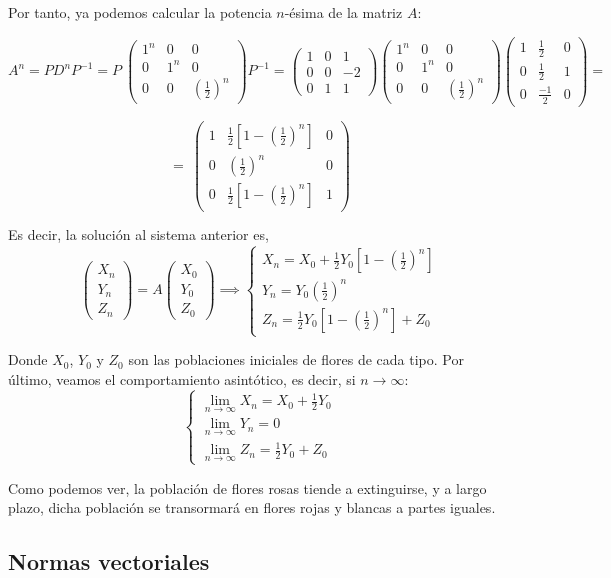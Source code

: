 \documentclass[11pt, a4paper]{article}
\newif\IfInSansMode
\numberwithin{equation}{section}
\theoremstyle{theorem-style}
\theoremstyle{definition-style}
\theoremstyle{remark-style}
\theoremstyle{example-style}
\begin{document}
Por tanto, ya podemos calcular la potencia $n$-ésima de la matriz $A$:

$$A^n = PD^nP^{-1} = P \
\begin{pmatrix}
  1^n & 0 & 0 \\
  0 & 1^n & 0 \\
  0 & 0 & \left(\frac{1}{2}\right)^n
\end{pmatrix} P^{-1} =
\begin{pmatrix}
  1 & 0 & 1 \\
  0 & 0 & -2 \\
  0 & 1 & 1
\end{pmatrix} \begin{pmatrix}
  1^n & 0 & 0 \\
  0 & 1^n & 0 \\
  0 & 0 & \left(\frac{1}{2}\right)^n
\end{pmatrix} \begin{pmatrix}
  1 & \frac{1}{2} & 0 \\
  0 & \frac{1}{2} & 1 \\
  0 & \frac{-1}{2} & 0
\end{pmatrix} = $$

$$= \
\begin{pmatrix}
  1 & \frac{1}{2} \left[1 -\left(\frac{1}{2}\right)^n \right] & 0 \\
  0 & \left( \frac{1}{2} \right)^n & 0 \\
  0 & \frac{1}{2} \left[1 -\left(\frac{1}{2}\right)^n \right] & 1
\end{pmatrix}$$


Es decir, la solución al sistema anterior es,
$$ \begin{pmatrix}
	X_n\\
	Y_n\\
	Z_n
\end{pmatrix} = A 
\begin{pmatrix}
	X_0\\
	Y_0\\
	Z_0
\end{pmatrix} \implies
\begin{cases}
  X_n = X_0 + \frac{1}{2} Y_0 \left[ 1 - \left( \frac{1}{2} \right)^n
  \right]\\
  Y_n = Y_0 \left( \frac{1}{2} \right)^n \\
  Z_n = \frac{1}{2} Y_0 \left[ 1 - \left( \frac{1}{2} \right)^n
  \right]
  + Z_0
\end{cases}$$

Donde $X_0$, $Y_0$ y $Z_0$ son las poblaciones iniciales de flores de cada tipo. Por último, veamos el comportamiento asintótico, es decir, si $n\to\infty$:
$$\begin{cases}
\underset{n\to\infty }{\lim} X_n = X_0 + \frac{1}{2}Y_0\\
\underset{n\to\infty }{\lim}Y_n = 0\\
\underset{n\to\infty }{\lim}Z_n = \frac{1}{2}Y_0 + Z_0
	
\end{cases}$$

Como podemos ver, la población de flores rosas tiende a extinguirse, y a largo plazo, dicha población se transormará en flores rojas y blancas a partes iguales.



\subsection{Normas vectoriales}
\end{document}
